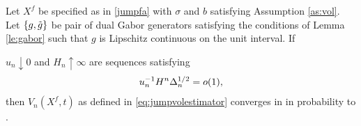 \begin{lem}\label{lem:finite}
  Let $X^f$ be specified as in \eqref{jumpfa} with $\sigma$ and $b$ satisfying Assumption \ref{as:vol}. Let $\{g, \tilde{g}\}$ be pair of dual Gabor generators satisfying the conditions of Lemma \eqref{le:gabor} such that $g$ is Lipschitz continuous on the unit interval. If 
  \begin{comment}
  \begin{enumerate}[label=\emph{(}\roman*\emph{)}]
    \item 
  the drift of $X$ satisfies with probability 1:
  \begin{align}
    \limsup_{\Delta_n \to 0} \frac{M^*}{(\Delta_n \log(1/\Delta_n))^{1/2}} \le  C< \infty, \notag
    \label{}
  \end{align}
where $M^* : = \sup_{1 \le i <n} \vert \int^{t_{i+1}}_{t_i} b(s) \D s\vert$;
\item the diffusion coefficient satisfies with probability 1:  $\int^1_0 \sigma^2(s) \D s < \infty$ and 
  \begin{align}
\limsup_{\Delta_n \to 0} \frac{S^*}{\Delta_n} \le B <\infty, \notag
    \label{}
  \end{align}
  where $S^* := \sup_{1 \le i <n} \vert \int^{t_{i+1}}_{t_i} \sigma^2(s) \D s\vert$;
  \end{enumerate}
  \end{comment}
 $u_n \downarrow 0 $ and $H_n \uparrow \infty$ are sequences satisfying  
\begin{align}
  u_n^{-1} H^n \Delta_n^{1/2} = o(1),\notag
    \label{}
  \end{align}
  then
  $V_n(X^f, t)$ as defined in \eqref{eq:jumpvolestimator}  converges in \Ltwo in probability to \sv.
\end{lem}
